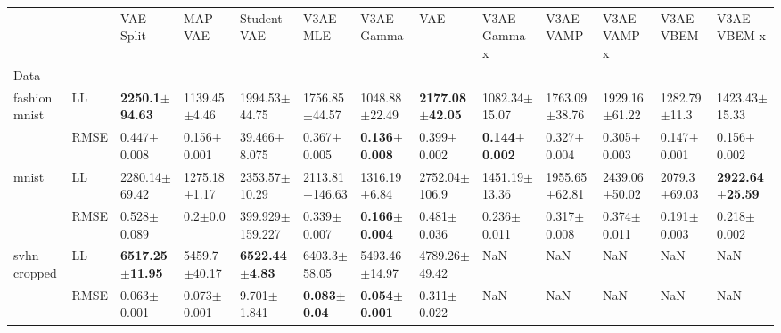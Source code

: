 \begin{tabular}{lllllllllllll}
\toprule
             &      &                   VAE-Split &           MAP-VAE &                Student-VAE &                 V3AE-MLE &                V3AE-Gamma &                         VAE &              V3AE-Gamma-x &          V3AE-VAMP &        V3AE-VAMP-x &         V3AE-VBEM &                 V3AE-VBEM-x \\
Data & {} &                             &                   &                            &                          &                           &                             &                           &                    &                    &                   &                             \\
\midrule
fashion mnist & LL &   \textbf{2250.1$\pm$94.63} &  1139.45$\pm$4.46 &          1994.53$\pm$44.75 &        1756.85$\pm$44.57 &         1048.88$\pm$22.49 &  \textbf{2177.08$\pm$42.05} &         1082.34$\pm$15.07 &  1763.09$\pm$38.76 &  1929.16$\pm$61.22 &  1282.79$\pm$11.3 &           1423.43$\pm$15.33 \\
             & RMSE &             0.447$\pm$0.008 &   0.156$\pm$0.001 &           39.466$\pm$8.075 &          0.367$\pm$0.005 &  \textbf{0.136$\pm$0.008} &             0.399$\pm$0.002 &  \textbf{0.144$\pm$0.002} &    0.327$\pm$0.004 &    0.305$\pm$0.003 &   0.147$\pm$0.001 &             0.156$\pm$0.002 \\
mnist & LL &           2280.14$\pm$69.42 &  1275.18$\pm$1.17 &          2353.57$\pm$10.29 &       2113.81$\pm$146.63 &          1316.19$\pm$6.84 &           2752.04$\pm$106.9 &         1451.19$\pm$13.36 &  1955.65$\pm$62.81 &  2439.06$\pm$50.02 &  2079.3$\pm$69.03 &  \textbf{2922.64$\pm$25.59} \\
             & RMSE &             0.528$\pm$0.089 &       0.2$\pm$0.0 &        399.929$\pm$159.227 &          0.339$\pm$0.007 &  \textbf{0.166$\pm$0.004} &             0.481$\pm$0.036 &           0.236$\pm$0.011 &    0.317$\pm$0.008 &    0.374$\pm$0.011 &   0.191$\pm$0.003 &             0.218$\pm$0.002 \\
svhn cropped & LL &  \textbf{6517.25$\pm$11.95} &  5459.7$\pm$40.17 &  \textbf{6522.44$\pm$4.83} &         6403.3$\pm$58.05 &         5493.46$\pm$14.97 &           4789.26$\pm$49.42 &                       NaN &                NaN &                NaN &               NaN &                         NaN \\
             & RMSE &             0.063$\pm$0.001 &   0.073$\pm$0.001 &            9.701$\pm$1.841 &  \textbf{0.083$\pm$0.04} &  \textbf{0.054$\pm$0.001} &             0.311$\pm$0.022 &                       NaN &                NaN &                NaN &               NaN &                         NaN \\
\bottomrule
\end{tabular}

